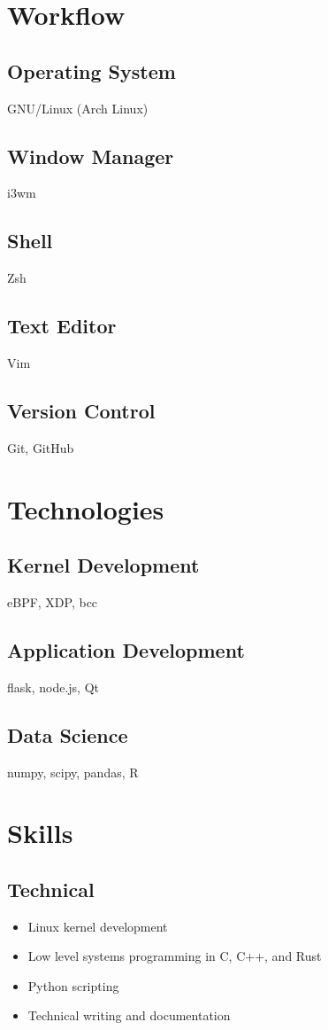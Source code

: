 \documentclass[
    10pt,
]
{article}
\begin{document}
\begin{figure}
\begin{minipage}[t]{0.32\textwidth}
\section{Workflow}

\subsection{Operating System}
GNU/Linux (Arch Linux)

\subsection{Window Manager}
i3wm

\subsection{Shell}
Zsh

\subsection{Text Editor}
Vim

\subsection{Version Control}
Git, GitHub

\section{Technologies}
\vspace{0.5em}
\subsection{Kernel Development}
eBPF, XDP, bcc
\subsection{Application Development}
flask, node.js, Qt
\subsection{Data Science}
numpy, scipy, pandas, R

\section{Skills}
\vspace{0.5em}
\subsection{Technical}
\begin{itemize}[itemsep=0em]
    \item Linux kernel development
    \item Low level systems programming in C, C++, and Rust
    \item Python scripting
    \item Technical writing and documentation
\end{itemize}

\end{minipage}
\end{figure}
\end{document}
